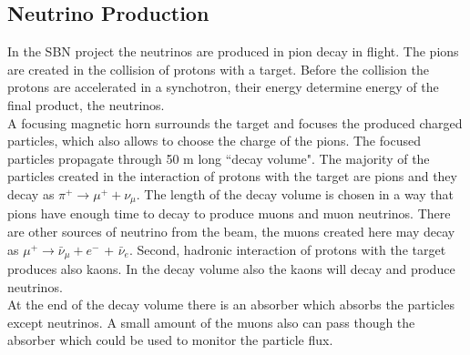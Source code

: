 \documentclass[a4paper]{article}\linespread{1.4}
\begin{document}

\subsection{Neutrino Production}
In the SBN project the neutrinos are produced in pion decay in flight. The pions are created in the collision of protons with a target.
Before the collision the protons are accelerated in a synchotron, %
their energy determine energy of the final product, the neutrinos.%
\\A focusing magnetic horn surrounds the target and focuses the produced charged particles, which also allows to choose the charge of the pions. The focused particles propagate through 50 m long ``decay volume". 
The majority of the particles created in the interaction of protons with the target are pions and they decay as $\pi^{+} \to \mu^{+} +  \nu_{\mu}$. The length of the decay volume is chosen in a way that pions have enough time to decay to produce muons and muon neutrinos.
There are other sources of neutrino from the beam, the muons created here may decay as $\mu^{+} \to \bar{\nu}_{\mu} +  e^{-}$ + $\bar{\nu}_{e}$. 
Second, hadronic interaction of protons with the target produces also kaons. 
In the decay volume also the kaons will decay and produce neutrinos.
\\At the end of the decay volume there is an absorber which absorbs the particles except neutrinos. A small amount of the muons also can pass though the absorber which could be used to monitor the particle flux.
\end{document}

